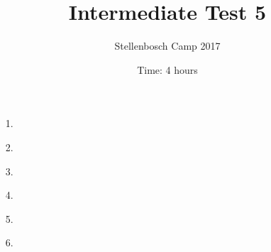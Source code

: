 \documentclass[12pt]{article}
\title{Intermediate Test 5}
\author{Stellenbosch Camp 2017}
\date{Time: 4 hours}
\begin{document}
 \maketitle

\begin{enumerate}

\item[1.] %


\item[2.] %


\item[3.] %


\item[4.] %
 

\item[5.] %


\item[6.] %


\end{enumerate}

\vfill

\centering
\begin{BVerbatim}
\end{BVerbatim}
\end{document}

